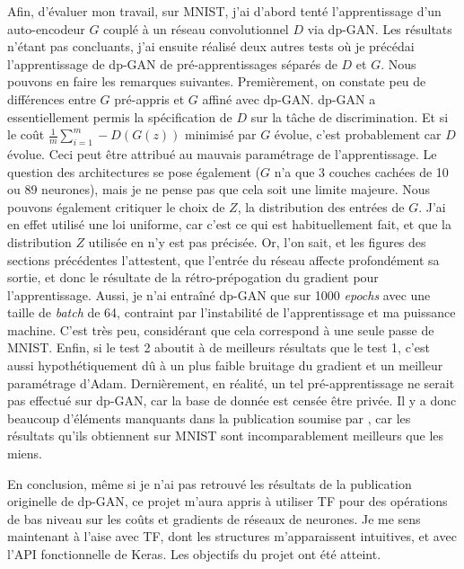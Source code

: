 \documentclass[a4paper,11pt,twoside]{article}
\theoremstyle{definition}
\begin{document}
Afin, d'évaluer mon travail, sur MNIST, j'ai d'abord tenté l'apprentissage d'un auto-encodeur $G$ couplé à un réseau convolutionnel $D$ via dp-GAN. Les résultats n'étant pas concluants, j'ai ensuite réalisé deux autres tests où je précédai l'apprentissage de dp-GAN de pré-apprentissages séparés de $D$ et $G$. Nous pouvons en faire les remarques suivantes. Premièrement, on constate peu de différences entre $G$ pré-appris et $G$ affiné avec dp-GAN. dp-GAN a essentiellement permis la spécification de $D$ sur la tâche de discrimination. Et si le coût $\frac{1}{m}\sum_{i=1}^m -D(G(z))$ minimisé par $G$ évolue, c'est probablement car $D$ évolue. Ceci peut être attribué au mauvais paramétrage de l'apprentissage. Le question des architectures se pose également ($G$ n'a que 3 couches cachées de 10 ou 89 neurones), mais je ne pense pas que cela soit une limite majeure. Nous pouvons également critiquer le choix de $Z$, la distribution des entrées de $G$. J'ai en effet utilisé une loi uniforme, car c'est ce qui est habituellement fait, et que la distribution $Z$ utilisée en \cite{dpgan} n'y est pas précisée. Or, l'on sait, et les figures des sections précédentes l'attestent, que l'entrée du réseau affecte profondément sa sortie, et donc le résultate de la rétro-prépogation du gradient pour l'apprentissage. Aussi, je n'ai entraîné dp-GAN que sur 1000 \textit{epochs} avec une taille de \textit{batch} de 64, contraint par l'instabilité de l'apprentissage et ma puissance machine. C'est très peu, considérant que cela correspond à une seule passe de MNIST. Enfin, si le test 2 aboutit à de meilleurs résultats que le test 1, c'est aussi hypothétiquement dû à un plus faible bruitage du gradient et un meilleur paramétrage d'Adam. Dernièrement, en réalité, un tel pré-apprentissage ne serait pas effectué sur dp-GAN, car la base de donnée est censée être privée. Il y a donc beaucoup d'éléments manquants dans la publication soumise par \citet{dpgan}, car les résultats qu'ils obtiennent sur MNIST sont incomparablement meilleurs que les miens.

En conclusion, même si je n'ai pas retrouvé les résultats de la publication originelle de dp-GAN, ce projet m'aura appris à utiliser TF pour des opérations de bas niveau sur les coûts et gradients de réseaux de neurones. Je me sens maintenant à l'aise avec TF, dont les structures m'apparaissent intuitives, et avec l'API fonctionnelle de Keras. Les objectifs du projet ont été atteint.


\printbibliography[title=Références,heading=bibintoc]
\end{document}
